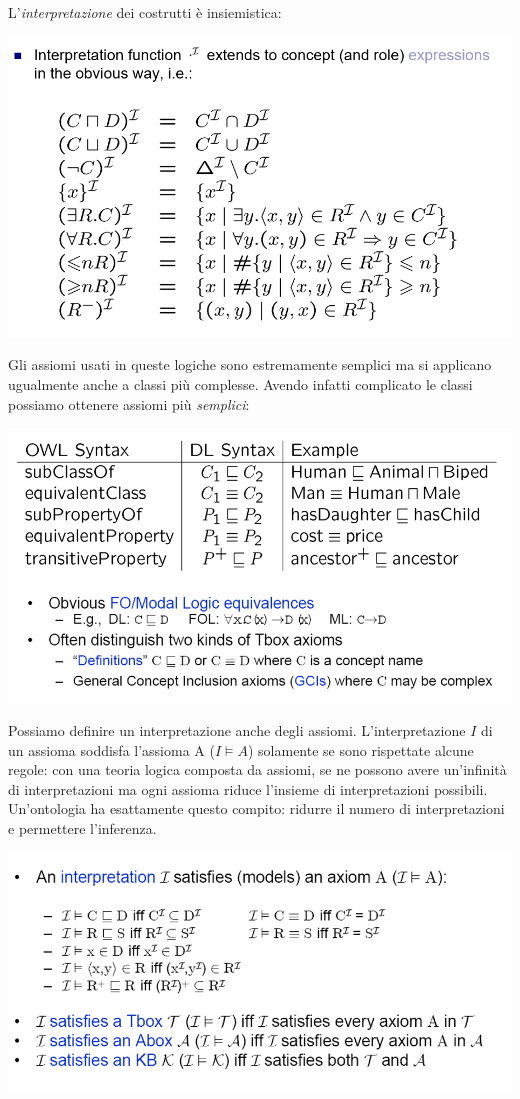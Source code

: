 \documentclass[11pt]{article}
\begin{document}
L'\textit{interpretazione} dei costrutti è insiemistica:
\begin{center}
\includegraphics[scale=0.4]{IMG3.png}
\end{center}
Gli assiomi usati in queste logiche sono estremamente semplici ma si applicano ugualmente anche a classi più complesse. Avendo infatti complicato le classi possiamo ottenere assiomi più \textit{semplici}:
\begin{center}
\includegraphics[scale=0.5]{IMG4.png}
\end{center}
Possiamo definire un interpretazione anche degli assiomi.
L'interpretazione $I$ di un assioma soddisfa l'assioma A ($I \models A$) solamente se sono rispettate alcune regole: con una teoria logica composta da assiomi, se ne possono avere un'infinità di interpretazioni ma ogni assioma riduce l'insieme di interpretazioni possibili.
Un'ontologia ha esattamente questo compito: ridurre il numero di interpretazioni e permettere l'inferenza.
\begin{center}
\includegraphics[scale=0.6]{IMG5.png}
\end{center}
\end{document}
